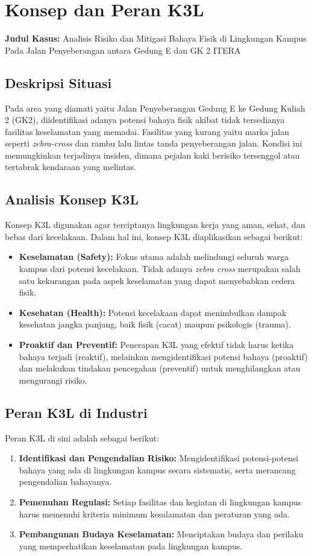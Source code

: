 \documentclass[a4paper, 12pt]{article}
\begin{document}
\section{Konsep dan Peran K3L}
\noindent\textbf{Judul Kasus:} Analisis Risiko dan Mitigasi Bahaya Fisik di Lingkungan Kampus Pada Jalan Penyeberangan antara Gedung E dan GK 2 ITERA 

\subsection{Deskripsi Situasi}
Pada area yang diamati yaitu Jalan Penyeberangan Gedung E ke Gedung Kuliah 2 (GK2), diidentifikasi adanya potensi bahaya fisik akibat tidak tersedianya
fasilitas keselamatan yang memadai. Fasilitas yang kurang yaitu marka jalan seperti \textit{zebra-cross} dan rambu lalu lintas tanda penyeberangan jalan.
Kondisi ini memungkinkan terjadinya insiden, dimana pejalan kaki berisiko tersenggol atau tertabrak kendaraan yang melintas.
\subsection{Analisis Konsep K3L}
Konsep K3L digunakan agar terciptanya lingkungan kerja yang aman, sehat, dan bebas dari kecelakaan. 
Dalam hal ini, konsep K3L diaplikasikan sebagai berikut:
\begin{itemize}
    \item \textbf{Keselamatan (Safety):} Fokus utama adalah melindungi seluruh warga kampus dari potensi kecelakaan. Tidak adanya \textit{zebra cross} merupakan 
      salah satu kekurangan pada aspek keselamatan yang dapat menyebabkan cedera fisik.
    \item \textbf{Kesehatan (Health):} Potensi kecelakaan dapat menimbulkan dampak kesehatan jangka panjang, baik fisik (cacat) maupun psikologis (trauma).
    \item \textbf{Proaktif dan Preventif:} Penerapan K3L yang efektif tidak harus ketika bahaya terjadi (reaktif), melainkan mengidentifikasi potensi bahaya (proaktif) dan 
      melakukan tindakan pencegahan (preventif) untuk menghilangkan atau mengurangi risiko.
\end{itemize}

\subsection{Peran K3L di Industri}
Peran K3L di sini adalah sebagai berikut:
\begin{enumerate}
    \item \textbf{Identifikasi dan Pengendalian Risiko:} Mengidentifikasi potensi-potensi bahaya yang ada di lingkungan kampus secara sistematis, serta merancang pengendalian bahayanya.
    \item \textbf{Pemenuhan Regulasi:} Setiap fasilitas dan kegiatan di lingkungan kampus harus memenuhi kriteria minimum kesalamatan dan peraturan yang ada.
    \item \textbf{Pembangunan Budaya Keselamatan:} Menciptakan budaya dan perilaku yang memperhatikan keselamatan pada lingkungan kampus. 
\end{enumerate}
\end{document}
